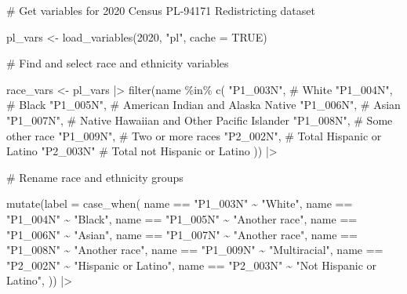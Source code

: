 \documentclass[
  letterpaper,
  DIV=11,
  numbers=noendperiod]{scrartcl}
\newenvironment{Shaded}{\begin{snugshade}}{\end{snugshade}}
\newcommand{\AttributeTok}[1]{\textcolor[rgb]{0.40,0.45,0.13}{#1}}
\newcommand{\CommentTok}[1]{\textcolor[rgb]{0.37,0.37,0.37}{#1}}
\newcommand{\ConstantTok}[1]{\textcolor[rgb]{0.56,0.35,0.01}{#1}}
\newcommand{\DecValTok}[1]{\textcolor[rgb]{0.68,0.00,0.00}{#1}}
\newcommand{\FunctionTok}[1]{\textcolor[rgb]{0.28,0.35,0.67}{#1}}
\newcommand{\NormalTok}[1]{\textcolor[rgb]{0.00,0.23,0.31}{#1}}
\newcommand{\OtherTok}[1]{\textcolor[rgb]{0.00,0.23,0.31}{#1}}
\newcommand{\SpecialCharTok}[1]{\textcolor[rgb]{0.37,0.37,0.37}{#1}}
\newcommand{\StringTok}[1]{\textcolor[rgb]{0.13,0.47,0.30}{#1}}
\begin{document}
\begin{Shaded}
\begin{Highlighting}[]
\CommentTok{\# Get variables for 2020 Census PL{-}94171 Redistricting dataset}

\NormalTok{pl\_vars }\OtherTok{\textless{}{-}} \FunctionTok{load\_variables}\NormalTok{(}\DecValTok{2020}\NormalTok{, }\StringTok{"pl"}\NormalTok{, }\AttributeTok{cache =} \ConstantTok{TRUE}\NormalTok{)}

\CommentTok{\# Find and select race and ethnicity variables}

\NormalTok{race\_vars }\OtherTok{\textless{}{-}}\NormalTok{ pl\_vars }\SpecialCharTok{|\textgreater{}} 
  \FunctionTok{filter}\NormalTok{(name }\SpecialCharTok{\%in\%} \FunctionTok{c}\NormalTok{(}
    \StringTok{"P1\_003N"}\NormalTok{, }\CommentTok{\# White}
    \StringTok{"P1\_004N"}\NormalTok{, }\CommentTok{\# Black}
    \StringTok{"P1\_005N"}\NormalTok{, }\CommentTok{\# American Indian and Alaska Native}
    \StringTok{"P1\_006N"}\NormalTok{, }\CommentTok{\# Asian}
    \StringTok{"P1\_007N"}\NormalTok{, }\CommentTok{\# Native Hawaiian and Other Pacific Islander}
    \StringTok{"P1\_008N"}\NormalTok{, }\CommentTok{\# Some other race}
    \StringTok{"P1\_009N"}\NormalTok{, }\CommentTok{\# Two or more races}
    \StringTok{"P2\_002N"}\NormalTok{, }\CommentTok{\# Total Hispanic or Latino}
    \StringTok{"P2\_003N"}  \CommentTok{\# Total not Hispanic or Latino}
\NormalTok{  )) }\SpecialCharTok{|\textgreater{}} 
  
  \CommentTok{\# Rename race and ethnicity groups }
  
  \FunctionTok{mutate}\NormalTok{(}\AttributeTok{label =} \FunctionTok{case\_when}\NormalTok{(}
\NormalTok{    name }\SpecialCharTok{==} \StringTok{"P1\_003N"} \SpecialCharTok{\textasciitilde{}} \StringTok{"White"}\NormalTok{,}
\NormalTok{    name }\SpecialCharTok{==} \StringTok{"P1\_004N"} \SpecialCharTok{\textasciitilde{}} \StringTok{"Black"}\NormalTok{,}
\NormalTok{    name }\SpecialCharTok{==} \StringTok{"P1\_005N"} \SpecialCharTok{\textasciitilde{}} \StringTok{"Another race"}\NormalTok{,}
\NormalTok{    name }\SpecialCharTok{==} \StringTok{"P1\_006N"} \SpecialCharTok{\textasciitilde{}} \StringTok{"Asian"}\NormalTok{,}
\NormalTok{    name }\SpecialCharTok{==} \StringTok{"P1\_007N"} \SpecialCharTok{\textasciitilde{}} \StringTok{"Another race"}\NormalTok{,}
\NormalTok{    name }\SpecialCharTok{==} \StringTok{"P1\_008N"} \SpecialCharTok{\textasciitilde{}} \StringTok{"Another race"}\NormalTok{,}
\NormalTok{    name }\SpecialCharTok{==} \StringTok{"P1\_009N"} \SpecialCharTok{\textasciitilde{}} \StringTok{"Multiracial"}\NormalTok{,}
\NormalTok{    name }\SpecialCharTok{==} \StringTok{"P2\_002N"} \SpecialCharTok{\textasciitilde{}} \StringTok{"Hispanic or Latino"}\NormalTok{,}
\NormalTok{    name }\SpecialCharTok{==} \StringTok{"P2\_003N"} \SpecialCharTok{\textasciitilde{}} \StringTok{"Not Hispanic or Latino"}\NormalTok{,}
\NormalTok{  )) }\SpecialCharTok{|\textgreater{}} 
  

\end{Highlighting}
\end{Shaded}
\end{document}
